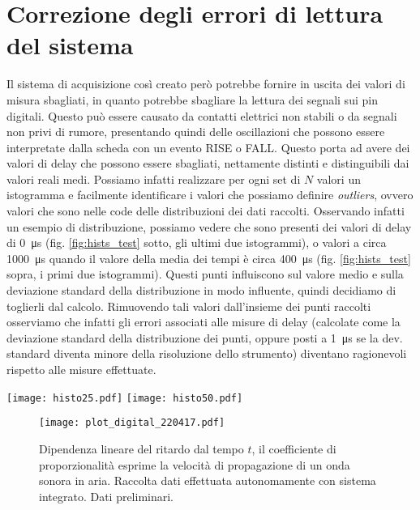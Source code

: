 \documentclass[
    rmp,
    reprint, 
    superscriptaddress, 
    altaffilletter, 
    amsmath, 
    amssymb, 
    a4paper,
    varvw]{revtex4-2}
\begin{document}
\section{Correzione degli errori di lettura del sistema}
Il sistema di acquisizione così creato però potrebbe fornire in uscita dei valori di misura sbagliati, in quanto potrebbe sbagliare la lettura dei segnali sui pin digitali. Questo può essere causato da contatti elettrici non stabili o da segnali non privi di rumore, presentando quindi delle oscillazioni che possono essere interpretate dalla scheda con un evento RISE o FALL. Questo porta ad avere dei valori di delay che possono essere sbagliati, nettamente distinti e distinguibili dai valori reali medi. Possiamo infatti realizzare per ogni set di $N$ valori un istogramma e facilmente identificare i valori che possiamo definire \emph{outliers}, ovvero valori che sono nelle code delle distribuzioni dei dati raccolti. Osservando infatti un esempio di distribuzione, possiamo vedere che sono presenti dei valori di delay di \SI{0}{\micro\second} (fig. \ref{fig:hists_test} sotto, gli ultimi due istogrammi), o valori a circa \SI{1000}{\micro\second} quando il valore della media dei tempi è circa \SI{400}{\micro\second} (fig. \ref{fig:hists_test} sopra, i primi due istogrammi).
Questi punti influiscono sul valore medio e sulla deviazione standard della distribuzione in modo influente, quindi decidiamo di toglierli dal calcolo. Rimuovendo tali valori dall'insieme dei punti raccolti osserviamo che infatti gli errori associati alle misure di delay (calcolate come la deviazione standard della distribuzione dei punti, oppure posti a \SI{1}{\micro\second} se la dev. standard diventa minore della risoluzione dello strumento) diventano ragionevoli rispetto alle misure effettuate. 

\begin{figure*}
    \texttt{[image: histo25.pdf]}
    \texttt{[image: histo50.pdf]}
    \caption{Istogrammi dei set di dati raccolti (sono riportati quelli per le misure a \SI{0.25}{\metre} e quelle per le misure a \SI{0.5}{\metre}). Per ogni distanza sono raccolti $N=50$ punti, sia per l'evento RISE che per l'evento FALL, in due istanti differenti, un per il primo fronte di variazione del segnale fornito dal microfono, uno per il secondo fronte. La media tra queste due misure permette di ottenere poi una misura più precisa dell'effettivo fronte d'onda che viene rilevato dal microfono. }\label{fig:hists_test}
\end{figure*}
\begin{figure}[!t]
    \centering
    \texttt{[image: plot\_digital\_220417.pdf]}
    \caption{Dipendenza lineare del ritardo dal tempo $t$, il coefficiente di proporzionalità esprime la velocità di propagazione di un onda sonora in aria. Raccolta dati effettuata autonomamente con sistema integrato. Dati preliminari.}\label{fig:digital_plot_d2}
\end{figure}
\end{document}
